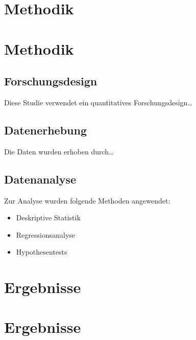 \documentclass[12pt, a4paper, twoside, openright]{report}
\providecommand{\tightlist}{%
  \setlength{\itemsep}{0pt}\setlength{\parskip}{0pt}}
\begin{document}

\chapter{Methodik}\label{methodik}


\chapter{Methodik}\label{methodik-1}

\section{Forschungsdesign}\label{forschungsdesign}

Diese Studie verwendet ein quantitatives Forschungsdesign\ldots{}

\section{Datenerhebung}\label{datenerhebung}

Die Daten wurden erhoben durch\ldots{}

\section{Datenanalyse}\label{datenanalyse}

Zur Analyse wurden folgende Methoden angewendet:

\begin{itemize}
\tightlist
\item
  Deskriptive Statistik
\item
  Regressionsanalyse
\item
  Hypothesentests
\end{itemize}


\chapter{Ergebnisse}\label{ergebnisse}


\chapter{Ergebnisse}\label{ergebnisse-1}
\end{document}

